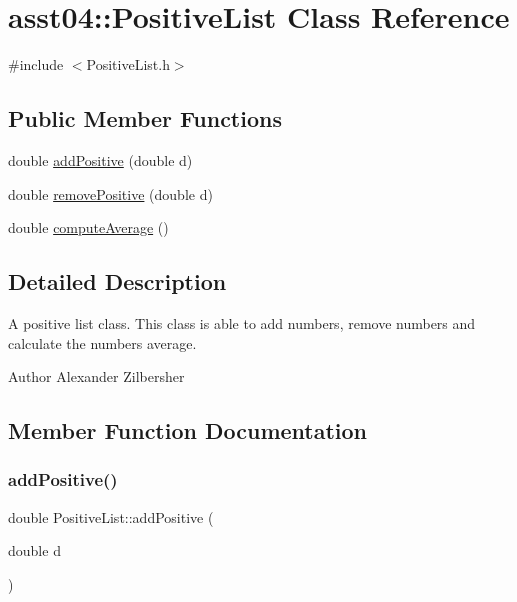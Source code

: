 \hypertarget{classasst04_1_1_positive_list}{}\section{asst04\+:\+:Positive\+List Class Reference}
\label{classasst04_1_1_positive_list}


{\ttfamily \#include $<$Positive\+List.\+h$>$}

\subsection*{Public Member Functions}
\begin{DoxyCompactItemize}
\item 
double \hyperlink{classasst04_1_1_positive_list_ad66574172bee14628e59317b167611e4}{add\+Positive} (double d)
\item 
double \hyperlink{classasst04_1_1_positive_list_a6c769f11952005e6edb5293bc80666d6}{remove\+Positive} (double d)
\item 
double \hyperlink{classasst04_1_1_positive_list_a3bc00641ab483f3b84c720bf28d250df}{compute\+Average} ()
\end{DoxyCompactItemize}


\subsection{Detailed Description}
A positive list class. This class is able to add numbers, remove numbers and calculate the numbers\textquotesingle{} average.

\begin{DoxyAuthor}{Author}
Alexander Zilbersher 
\end{DoxyAuthor}


\subsection{Member Function Documentation}
\hypertarget{classasst04_1_1_positive_list_ad66574172bee14628e59317b167611e4}{}\label{classasst04_1_1_positive_list_ad66574172bee14628e59317b167611e4} 
\subsubsection{\texorpdfstring{add\+Positive()}{addPositive()}}
{\footnotesize\ttfamily double Positive\+List\+::add\+Positive (\begin{DoxyParamCaption}\item[{double}]{d }\end{DoxyParamCaption})}

